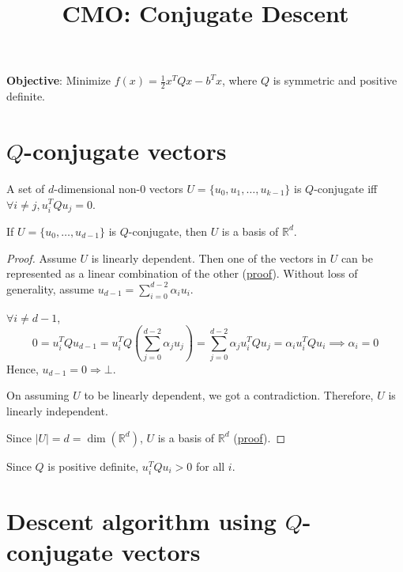 


\title{CMO: Conjugate Descent}



\maketitle
\initMinimal{}

\textbf{Objective}: Minimize $f(x) = \frac{1}{2}x^TQx - b^Tx$,
where $Q$ is symmetric and positive definite.

\tableofcontents

\section{\texorpdfstring{$Q$}{Q}-conjugate vectors}

\begin{definition}
A set of $d$-dimensional non-0 vectors $U = \{u_0, u_1, \ldots, u_{k-1}\}$ is $Q$-conjugate
iff $\forall i \neq j, u_i^TQu_j = 0$.
\end{definition}

\begin{theorem}
If $U = \{u_0, \ldots, u_{d-1}\}$ is $Q$-conjugate, then $U$ is a basis of $\mathbb{R}^d$.
\end{theorem}
\begin{proof}
Assume $U$ is linearly dependent.
Then one of the vectors in $U$ can be represented as a linear combination of the other
(\href{https://sharmaeklavya2.github.io/theoremdep/nodes/linear-algebra/vector-spaces/linindep.html}{proof}).
Without loss of generality, assume $u_{d-1} = \sum_{i=0}^{d-2} \alpha_i u_i$.

$\forall i \neq d-1$,
\[ 0 = u_i^TQu_{d-1}
= u_i^TQ\left(\sum_{j=0}^{d-2} \alpha_j u_j \right)
= \sum_{j=0}^{d-2} \alpha_j u_i^TQu_j
= \alpha_i u_i^TQu_i
\implies \alpha_i = 0 \]
Hence, $u_{d-1} = 0 \Rightarrow \bot$.

On assuming $U$ to be linearly dependent, we got a contradiction.
Therefore, $U$ is linearly independent.

Since $|U| = d = \dim(\mathbb{R}^d)$,
$U$ is a basis of $\mathbb{R}^d$
(\href{https://sharmaeklavya2.github.io/theoremdep/nodes/linear-algebra/vector-spaces/basis/n-linindep-is-basis.html}{proof}).
\end{proof}

Since $Q$ is positive definite, $u_i^TQu_i > 0$ for all $i$.

\section{Descent algorithm using \texorpdfstring{$Q$}{Q}-conjugate vectors}

